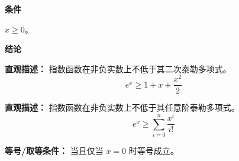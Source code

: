 \begin{statementbox}

\textbf{\textcolor{CStatement}{条件}}
\begin{description}[style=nextline, leftmargin=2.8em, labelsep=0.5em, itemsep=0.35em]
    \item[\textbf{\textcolor{CStatement}{条件1（非负实数）：}}] $x \geq 0$。
\end{description}

\textbf{\textcolor{CStatement}{结论}}
\begin{description}[style=nextline, leftmargin=2.8em, labelsep=0.5em, itemsep=0.45em]
    \item[\textbf{\textcolor{CStatement}{结论一（二次下界）：}}]
    \textbf{\textcolor{CStatement}{直观描述：}} 指数函数在非负实数上不低于其二次泰勒多项式。
    \[
    e^x \geq 1 + x + \frac{x^2}{2}
    \]

    \item[\textbf{\textcolor{CStatement}{推广结论（泰勒下界）：}}]
    \textbf{\textcolor{CStatement}{直观描述：}} 指数函数在非负实数上不低于其任意阶泰勒多项式。
    \[
    e^x \geq \sum_{i=0}^{n} \frac{x^i}{i!}
    \]
\end{description}

\textbf{\textcolor{CStatement}{等号/取等条件：}} 当且仅当 $x=0$ 时等号成立。

\end{statementbox}
